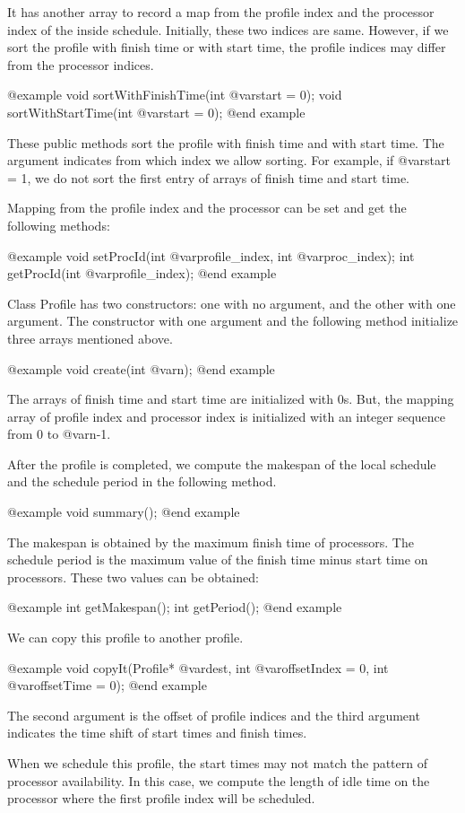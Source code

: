 {It has another array to record a map from the profile index and the 
processor index of the inside schedule. Initially, these two indices are
same. However, if we sort the profile with finish time or with start time,
the profile indices may differ from the processor indices.

@example
void sortWithFinishTime(int @var{start} = 0);
void sortWithStartTime(int @var{start} = 0);
@end example

These public methods sort the profile with finish time and with start time.
The argument indicates from which index we allow sorting. For example,
if @var{start} = 1, we do not sort the first entry of arrays of finish time
and start time. 

Mapping from the profile index and the processor can be set and get the
following methods:

@example
void setProcId(int @var{profile_index}, int @var{proc_index});
int getProcId(int @var{profile_index});
@end example

Class Profile has two constructors: one with no argument, and the other
with one argument. The constructor with one argument and the following method
initialize three arrays mentioned above.

@example
void create(int @var{n});
@end example

The arrays of finish time and start time are initialized with 0s. But,
the mapping array of profile index and processor index is initialized with
an integer sequence from 0 to @var{n}-1.

After the profile is completed, we compute the makespan of the local schedule
and the schedule period in the following method.

@example
void summary();
@end example

The makespan is obtained by the maximum finish time of processors.
The schedule period is the maximum value of the finish time minus start time
on processors. These two values can be obtained:

@example
int getMakespan();
int getPeriod();
@end example

We can copy this profile to another profile.

@example
void copyIt(Profile* @var{dest}, int @var{offsetIndex} = 0, int @var{offsetTime} = 0);
@end example

The second argument is the offset of profile indices and the third argument
indicates the time shift of start times and finish times.

When we schedule this profile, the start times may not match the pattern
of processor availability. In this case, we compute the length of idle
time on the processor where the first profile index will be scheduled.

}
